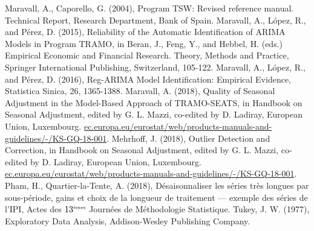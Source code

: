 \documentclass[12pt, a4paper]{article}
\begin{document}
\begin{thebibliography}{999}
 Maravall, A., Caporello, G. (2004), Program TSW: Revised reference manual. Technical Report, Research Department, Bank of Spain.
 Maravall, A., L\'{o}pez, R., and P\'{e}rez, D. (2015), Reliability of the Automatic Identification of ARIMA Models in Program TRAMO, in Beran, J., Feng, Y., and Hebbel, H. (eds.) Empirical Economic and Financial Research. Theory, Methods and Practice, Springer International Publishing, Switzerland, 105-122.
 Maravall, A., L\'{o}pez, R., and P\'{e}rez, D. (2016), Reg-ARIMA Model Identification: Empirical Evidence, Statistica Sinica, 26, 1365-1388.
 Maravall, A. (2018), Quality of Seasonal Adjustment in the Model-Based Approach of TRAMO-SEATS, in Handbook on Seasonal Adjustment, edited by G. L. Mazzi, co-edited by D. Ladiray, European Union, Luxembourg. \url{ec.europa.eu/eurostat/web/products-manuals-and-guidelines/-/KS-GQ-18-001}.
 Mehrhoff, J. (2018), Outlier Detection and Correction, in Handbook on Seasonal Adjustment, edited by G. L. Mazzi, co-edited by D. Ladiray, European Union, Luxembourg. \url{ec.europa.eu/eurostat/web/products-manuals-and-guidelines/-/KS-GQ-18-001}.
 Pham, H., Quartier-la-Tente, A. (2018), Désaisonnaliser les séries très longues par sous-période, gains et choix de la longueur de traitement --- exemple des séries de l'IPI, Actes des $13^{\mbox{\tiny èmes}}$ Journées de Méthodologie Statistique. 
 Tukey, J. W. (1977), Exploratory Data Analysis, Addison-Wesley Publishing Company.





\end{thebibliography}

%
\end{document}
